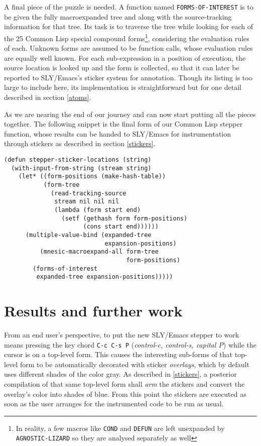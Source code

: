 \documentclass[sigconf]{acmart}
\begin{document}
A final piece of the puzzle is needed.  A function named
\texttt{FORMS-OF-INTEREST} is to be given the fully macroexpanded tree
and along with the source-tracking information for that tree.  Its
task is to traverse the tree while looking for each of the 25 Common
Lisp special compound forms\footnote{In reality, a few macros like
  \texttt{COND} and \texttt{DEFUN} are left unexpanded by
  \texttt{AGNOSTIC-LIZARD} so they are analysed separately as well},
considering the evaluation rules of each.  Unknown forms are assumed
to be function calls, whose evaluation rules are equally well known.
For each sub-expression in a position of execution, the source
location is looked up and the form is collected, so that it can later
be reported to SLY/Emacs's sticker system for annotation.  Though its
listing is too large to include here, its implementation is
straightforward but for one detail described in section \ref{atoms}.

As we are nearing the end of our journey and can now start putting all
the pieces together. The following snippet is the final form of our
Common Lisp stepper function, whose results can be handed to SLY/Emacs
for instrumentation through stickers as described in section
\ref{stickers}.

\begin{verbatim}
(defun stepper-sticker-locations (string)
  (with-input-from-string (stream string)
    (let* ((form-positions (make-hash-table))
           (form-tree
             (read-tracking-source
              stream nil nil nil
              (lambda (form start end)
                (setf (gethash form form-positions)
                      (cons start end))))))
      (multiple-value-bind (expanded-tree
                            expansion-positions)
          (mnesic-macroexpand-all form-tree
                                  form-positions)
        (forms-of-interest
         expanded-tree expansion-positions)))))
\end{verbatim}

\section{Results and further work}\label{results}

From an end user's perspective, to put the new SLY/Emacs stepper to
work means pressing the key chord \texttt{C-c C-s P} (\emph{control-c,
  control-s, capital P}) while the cursor is on a top-level form.
This causes the interesting sub-forms of that top-level form to be
automatically decorated with sticker \emph{overlays}, which by default
uses different shades of the color gray.  As described in
\ref{stickers}, a posterior compilation of that same top-level form
shall \emph{arm} the stickers and convert the overlay's color into
shades of blue.  From this point the stickers are executed as soon as
the user arranges for the instrumented code to be run as usual.
\end{document}
